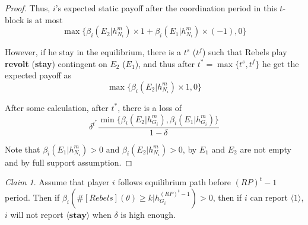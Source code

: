 \documentclass[12pt,letter]{article}
\theoremstyle{definition}
\theoremstyle{remark}
\theoremstyle{claim}
\newtheorem{claim}{Claim}
\begin{document}
\begin{proof}
Thus, $i$'s expected static payoff after the coordination period in this $t$-block is at most 
\[
{\max\{\beta_{i}(E_2|h^{m}_{N_i})\times 1+\beta_{i}(E_1|h^{m}_{N_i})\times (-1), 0\}}
\]

However, if he stay in the equilibrium, there is a $t^s$ ($t^f$) such that Rebels play \textbf{revolt} (\textbf{stay}) contingent on $E_2$ ($E_1$), and thus after $t^*=\max\{t^s,t^f\}$ he get the expected payoff as
\[
{\max\{\beta_{i}(E_2|h^{m}_{N_i})\times 1, 0\}}
\]

After some calculation, after $t^*$, there is a loss of
\[\delta^{t^{*}}\frac{\min\{\beta_{i}(E_2|h^{m}_{G_i}),\beta_{i}(E_1|h^{m}_{G_i})\}}{1-\delta}\]
 



Note that $\beta_{i}(E_1|h^{m}_{N_i})>0$ and $\beta_{i}(E_2|h^{m}_{N_i})>0$, by $E_1$ and $E_2$ are not empty and by full support assumption.


\end{proof}







\begin{claim}
\label{claim_must_report_1}
Assume that player $i$ follows equilibrium path before $(RP)^t-1$ period. Then if $\beta_{i}(\#[Rebels](\theta)\geq k|h^{(RP)^t-1}_{G_i})>0$,  then if $i$ can report $\langle 1 \rangle$,  $i$ will not report $\langle \textbf{stay} \rangle$ when $\delta$ is high enough.
\end{claim}
\end{document}

